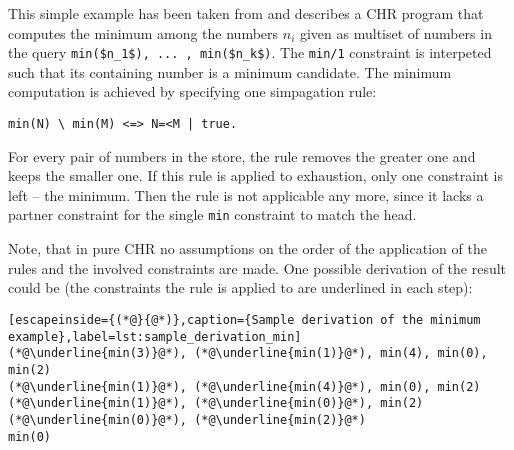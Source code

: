 \begin{example}[Minimum]
\label{ex:minimum}

This simple example has been taken from \cite[19\psqq]{fru_chr_book_2009} and describes a CHR program that computes the minimum among the numbers $n_i$ given as multiset of numbers in the query \lstinline[mathescape]|min($n_1$), ... , min($n_k$)|. The \lstinline|min/1| constraint is interpeted such that its containing number is a minimum candidate. The minimum computation is achieved by specifying one simpagation rule:

\begin{lstlisting}[caption={Minimum program}]
min(N) \ min(M) <=> N=<M | true.
\end{lstlisting}

For every pair of numbers in the store, the rule removes the greater one and keeps the smaller one. If this rule is applied to exhaustion, only one constraint is left -- the minimum. Then the rule is not applicable any more, since it lacks a partner constraint for the single \lstinline|min| constraint to match the head.

Note, that in pure CHR no assumptions on the order of the application of the rules and the involved constraints are made. One possible derivation of the result could be (the constraints the rule is applied to are underlined in each step):

\begin{lstlisting}[escapeinside={(*@}{@*)},caption={Sample derivation of the minimum example},label=lst:sample_derivation_min]
(*@\underline{min(3)}@*), (*@\underline{min(1)}@*), min(4), min(0), min(2)
(*@\underline{min(1)}@*), (*@\underline{min(4)}@*), min(0), min(2)
(*@\underline{min(1)}@*), (*@\underline{min(0)}@*), min(2)
(*@\underline{min(0)}@*), (*@\underline{min(2)}@*)
min(0)
\end{lstlisting}
\end{example}

